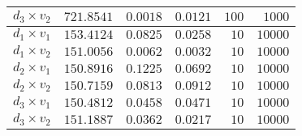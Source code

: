 \begin{tabular}{lrrrrr}
   $d_3 \times v_2$ &                   $721.8541$ &                        $0.0018$ &                         $0.0121$ &                   $100$ &                  $1000$ \\
   \midrule
   $d_1 \times v_1$ &                   $153.4124$ &                        $0.0825$ &                         $0.0258$ &                    $10$ &                 $10000$ \\
   $d_1 \times v_2$ &                   $151.0056$ &                        $0.0062$ &                         $0.0032$ &                    $10$ &                 $10000$ \\
   $d_2 \times v_1$ &                   $150.8916$ &                        $0.1225$ &                         $0.0692$ &                    $10$ &                 $10000$ \\
   $d_2 \times v_2$ &                   $150.7159$ &                        $0.0813$ &                         $0.0912$ &                    $10$ &                 $10000$ \\
   $d_3 \times v_1$ &                   $150.4812$ &                        $0.0458$ &                         $0.0471$ &                    $10$ &                 $10000$ \\
   $d_3 \times v_2$ &                   $151.1887$ &                        $0.0362$ &                         $0.0217$ &                    $10$ &                 $10000$ \\
  \bottomrule
\end{tabular}
